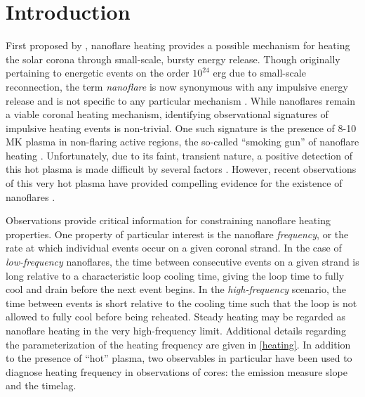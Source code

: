 \section{Introduction}\label{introduction}

First proposed by \citet{parker_nanoflares_1988}, nanoflare heating provides a possible mechanism for heating the solar corona through small-scale, bursty energy release. Though originally pertaining to energetic events on the order $10^{24}$ erg due to small-scale reconnection, the term \textit{nanoflare} is now synonymous with any impulsive energy release and is not specific to any particular mechanism \citep{klimchuk_key_2015}. While nanoflares remain a viable coronal heating mechanism, identifying observational signatures of impulsive heating events is non-trivial. One such signature is the presence of 8-10 MK plasma in non-flaring active regions, the so-called ``smoking gun'' of nanoflare heating \citep{cargill_implications_1994}. Unfortunately, due to its faint, transient nature, a positive detection of this hot plasma is made difficult by several factors \citep{winebarger_defining_2012,barnes_inference_2016}. However, recent observations of this very hot plasma have provided compelling evidence for the existence of nanoflares \citep[e.g.][]{reale_evidence_2009,schmelz_hinode_2009,testa_hinode/eis_2012,brosius_pervasive_2014,caspi_new_2015,parenti_spectroscopy_2017,ishikawa_detection_2017}.

Observations provide critical information for constraining nanoflare heating properties. One property of particular interest is the nanoflare \textit{frequency}, or the rate at which individual events occur on a given coronal strand. In the case of \textit{low-frequency} nanoflares, the time between consecutive events on a given strand is long relative to a characteristic loop cooling time, giving the loop time to fully cool and drain before the next event begins. In the \textit{high-frequency} scenario, the time between events is short relative to the cooling time such that the loop is not allowed to fully cool before being reheated. Steady heating may be regarded as nanoflare heating in the very high-frequency limit. Additional details regarding the parameterization of the heating frequency are given in \autoref{heating}. In addition to the presence of ``hot'' plasma, two observables in particular have been used to diagnose heating frequency in observations of \AR{} cores: the emission measure slope and the timelag. 

